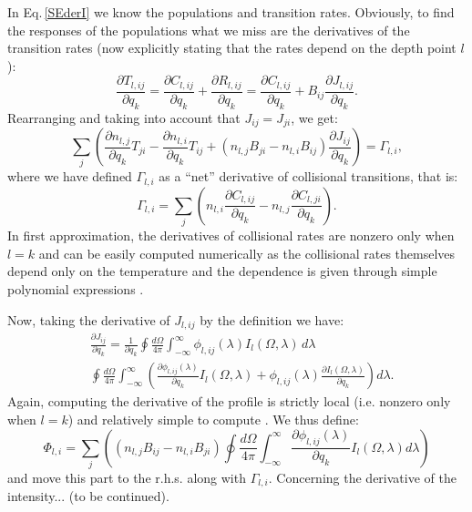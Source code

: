 \documentclass[referee]{aa}
\begin{document}
In Eq.\,\ref{SEderI} we know the populations and transition rates. Obviously, to find the responses of the populations what we miss are the derivatives of the transition rates (now explicitly stating that the rates depend on the depth point $l$):
\begin{equation}
 \frac{\partial T_{l,ij}}{\partial q_k} = \frac{\partial C_{l,ij}}{\partial q_k} + \frac{\partial R_{l,ij}}{\partial q_k} = \frac{\partial C_{l,ij}}{\partial q_k} + B_{ij} \frac{\partial J_{l,ij}}{\partial q_k}.
\end{equation}
Rearranging and taking into account that $J_{ij} = J_{ji}$, we get:
\begin{equation}
 \sum_j \left ( \frac{\partial n_{l,j}}{\partial q_k} T_{ji} - \frac{\partial n_{l,i}}{\partial q_k} T_{ij} + (n_{l,j}B_{ji} - n_{l,i}B_{ij}) \frac{\partial J_{ij}}{\partial q_k} \right ) = \Gamma_{l,i},
\end{equation}
where we have defined $\Gamma_{l,i}$ as a ``net'' derivative of collisional transitions, that is:
\begin{equation}
 \Gamma_{l,i} = \sum_j (n_{l,i} \frac{\partial C_{l,ij}}{\partial q_k} - n_{l,j} \frac{\partial C_{l,ji}}{\partial q_k}).
\end{equation}
In first approximation, the derivatives of collisional rates are nonzero only when $l=k$ and can be easily computed numerically as the collisional rates themselves depend only on the temperature and the dependence is given through simple polynomial expressions \citep{Mihalasbook}. 

Now, taking the derivative of $J_{l,ij}$ by the definition we have:
\begin{align}
 & \frac{\partial J_{ij}}{\partial q_k} = \frac{1}{\partial q_k} \oint \frac{d\Omega}{4\pi} \int_{-\infty}^{\infty} \phi_{l,ij}(\lambda) I_l(\Omega,\lambda)\,d\lambda \nonumber \\
 & \oint \frac{d\Omega}{4\pi} \int_{-\infty}^{\infty} \left (\frac{\partial\phi_{l,ij}(\lambda)}{\partial q_k} I_l(\Omega,\lambda) +  \phi_{l,ij}(\lambda) \frac{\partial I_l(\Omega,\lambda)}{\partial q_k} \right)d\lambda.
\end{align}
Again, computing the derivative of the profile is strictly local (i.e. nonzero only when $l=k$) and relatively simple to compute \citep[see][]{dtibook}. We thus define:
\begin{equation}
 \Phi_{l,i} = \sum_j \left ( (n_{l,j} B_{ij} - n_{l,i} B_{ji}) \oint \frac{d\Omega}{4\pi} \int_{-\infty}^{\infty} \frac{\partial\phi_{l,ij}(\lambda)}{\partial q_k} I_l(\Omega,\lambda) d\lambda \right )
\end{equation}
and move this part to the r.h.s. along with $\Gamma_{l,i}$. Concerning the derivative of the intensity... (to be continued).
\end{document}
